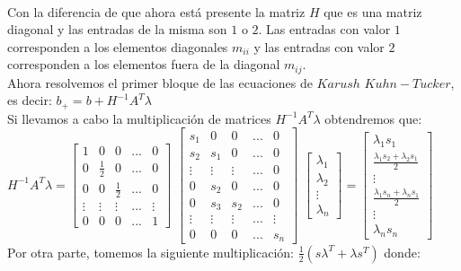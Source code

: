 \documentclass[12pt]{article}
\begin{document}
\\
Con la diferencia de que ahora est\'a presente la matriz $H$ que es una matriz diagonal y las entradas de la misma son $1$ o $2$. Las entradas con valor $1$ corresponden a los elementos diagonales $m_{ii}$ y las entradas con valor $2$ corresponden a los elementos fuera de la diagonal $m_{ij}$.
\\
Ahora resolvemos el primer bloque de las ecuaciones de $Karush$ $Kuhn-Tucker$, es decir: $b_{+} = b + H^{-1}A^{T}\lambda$
\\
Si llevamos a cabo la multiplicaci\'on de matrices $H^{-1}A^{T}\lambda$ obtendremos que:
\\
$H^{-1}A^{T}\lambda =
\begin{bmatrix}
1 & 0 & 0 & ... & 0 \\
0 & \frac{1}{2} & 0 & ... & 0 \\
0 & 0 & \frac{1}{2} & ... & 0 \\
\vdots & \vdots & \vdots & ... & \vdots \\
0 & 0 & 0 & ... & 1
\end{bmatrix}$
$\begin{bmatrix}
s_{1} & 0 & 0 & ... & 0 \\
s_{2} & s_{1} & 0 & ... & 0 \\
\vdots & \vdots & \vdots & ... & 0 \\
0 & s_{2} & 0 & ... & 0 \\
0 & s_{3} & s_{2} & ... & 0 \\
\vdots & \vdots & \vdots & ... & \vdots \\
0 & 0 & 0 & ... & s_{n}
\end{bmatrix}$
$\begin{bmatrix}
\lambda_{1} \\
\lambda_{2} \\
\vdots \\
\lambda_{n}
\end{bmatrix}=
\begin{bmatrix}
\lambda_{1}s_{1} \\
\frac{\lambda_{1}s_{2} + \lambda_{2}s_{1}}{2} \\
\vdots \\
\frac{\lambda_{1}s_{n} + \lambda_{n}s_{1}}{2} \\
\vdots \\
\lambda_{n}s_{n}
\end{bmatrix}$
\\
Por otra parte, tomemos la siguiente multiplicaci\'on: $\frac{1}{2} (s\lambda^{T} + \lambda s^{T})$ donde:
\\
\end{document}

